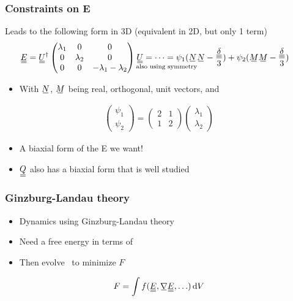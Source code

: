 \documentclass[10pt,mathserif]{beamer}
\begin{document}
\begin{frame}
    \frametitle{Constraints on E}
    Leads to the following form in 3D \color{gray} (equivalent in 2D, but only 1 term) \normalcolor
    \begin{align*}
        \du{E} &= \du{U}^\dagger \begin{pmatrix}
            \lambda_1 & 0 & 0 \\
            0 & \lambda_2 & 0 \\
            0 & 0 & - \lambda_1 - \lambda_2
        \end{pmatrix} \underset{\text{also using symmetry}}{\du{U} = \cdots = \psi_1(\su{N}}\su{N} - \frac{\du{\delta}}{3}) + \psi_2(\su{M}\su{M} - \frac{\du{\delta}}{3})
    \end{align*}
    \begin{itemize}
        \item With $\su{N}$, $\su{M}$ being real, orthogonal, unit vectors, and
    \end{itemize}
    \begin{align*}
        \begin{pmatrix} \psi_1 \\ \psi_2 \end{pmatrix} = \begin{pmatrix} 2 & 1 \\ 1 & 2 \end{pmatrix} \begin{pmatrix} \lambda_1 \\ \lambda_2 \end{pmatrix}
    \end{align*}
    \begin{itemize}
        \item A biaxial form of the E we want!
        \item \color{gray} $\du{Q}$ also has a biaxial form that is well studied \normalcolor
    \end{itemize}
\end{frame}

\begin{frame}
    \frametitle{Ginzburg-Landau theory}
    \begin{itemize}
        \item Dynamics using Ginzburg-Landau theory
        \item Need a free energy in terms of \EE
        \item Then evolve \EE\ to minimize $F$
    \end{itemize}
    \begin{equation*}
        F = \int f(\du{E}, \mgrad\du{E}, \ldots) \dd{V}
    \end{equation*}
\end{frame}
\end{document}
